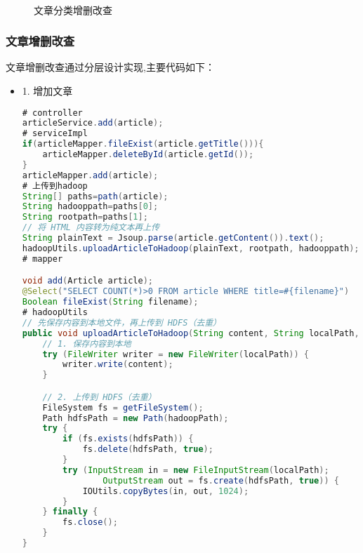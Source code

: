 \documentclass[bachelor]{thesis-uestc}
\begin{document}
\begin{figure}[htbp]
    \centering
    \\
    \caption{文章分类增删改查}
    \label{cate}
\end{figure}
\subsubsection{文章增删改查}
文章增删改查通过分层设计实现,主要代码如下：
\begin{itemize}
\item 1. 增加文章
\begin{lstlisting}[language=Java]
# controller
articleService.add(article);
# serviceImpl
if(articleMapper.fileExist(article.getTitle())){
    articleMapper.deleteById(article.getId());
}
articleMapper.add(article);
# 上传到hadoop
String[] paths=path(article);
String hadooppath=paths[0];
String rootpath=paths[1];
// 将 HTML 内容转为纯文本再上传
String plainText = Jsoup.parse(article.getContent()).text();
hadoopUtils.uploadArticleToHadoop(plainText, rootpath, hadooppath);
# mapper

void add(Article article);
@Select("SELECT COUNT(*)>0 FROM article WHERE title=#{filename}")
Boolean fileExist(String filename);
# hadoopUtils
// 先保存内容到本地文件，再上传到 HDFS（去重）
public void uploadArticleToHadoop(String content, String localPath, String hadoopPath) throws Exception {
    // 1. 保存内容到本地
    try (FileWriter writer = new FileWriter(localPath)) {
        writer.write(content);
    }

    // 2. 上传到 HDFS（去重）
    FileSystem fs = getFileSystem();
    Path hdfsPath = new Path(hadoopPath);
    try {
        if (fs.exists(hdfsPath)) {
            fs.delete(hdfsPath, true);
        }
        try (InputStream in = new FileInputStream(localPath);
                OutputStream out = fs.create(hdfsPath, true)) {
            IOUtils.copyBytes(in, out, 1024);
        }
    } finally {
        fs.close();
    }
}
\end{lstlisting}


\end{itemize}
\end{document}
